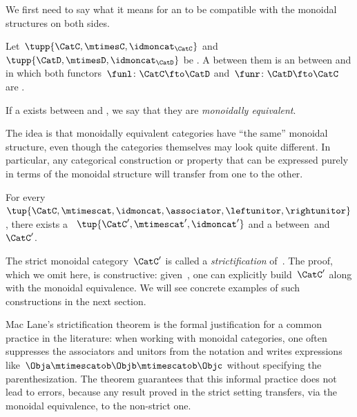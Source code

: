 We first need to say what it means for an  to be compatible with the monoidal structures on both sides.


\begin{ctdefinition}
    \label{def:monoidal-equivalence}
    Let~$\tupp{\CatC,\mtimesC,\idmoncat_{\CatC}}$ and~$\tupp{\CatD,{{\mtimesD}},\idmoncat_{\CatD}}$ be .
    A  between them is an  between \CatC and \CatD in which both functors~$\funl \colon \CatC \fto \CatD$ and~$\funr \colon \CatD \fto \CatC$ are .

    If a  exists between \CatC and \CatD, we say that they are \emph{monoidally equivalent}.
\end{ctdefinition}

The idea is that monoidally equivalent categories have ``the same'' monoidal structure, even though the categories themselves may look quite different.
In particular, any categorical construction or property that can be expressed purely in terms of the monoidal structure will transfer from one to the other.

\begin{theorem}
    \label{thm:maclane-strictification}
    For every ~$\tup{\CatC, \mtimescat, \idmoncat, \associator, \leftunitor, \rightunitor}$, there exists a ~$\tup{\CatC', \mtimescat', \idmoncat'}$ and a  between~\CatC and~$\CatC'$.
\end{theorem}

The strict monoidal category~$\CatC'$ is called a \emph{strictification} of~\CatC.
The proof, which we omit here, is constructive: given~\CatC, one can explicitly build~$\CatC'$ along with the monoidal equivalence.
We will see concrete examples of such constructions in the next section.

\begin{remark}
    Mac Lane's strictification theorem is the formal justification for a common practice in the literature: when working with monoidal categories, one often suppresses the associators and unitors from the notation and writes expressions like~$\Obja \mtimescatob \Objb \mtimescatob \Objc$ without specifying the parenthesization.
    The theorem guarantees that this informal practice does not lead to errors, because any result proved in the strict setting transfers, via the monoidal equivalence, to the non-strict one.
\end{remark}

